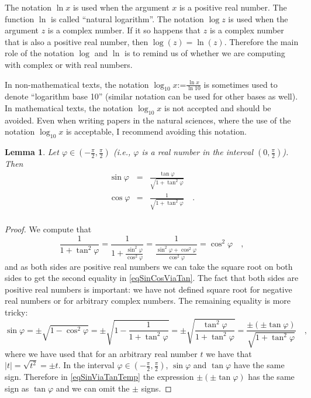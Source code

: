 \documentclass[12pt]{book}
\newcommand{\eqdef}{\textbf{:=}}
\newtheorem{lemma}[theorem]{Lemma}
\begin{document}
The notation $\ln x$  is used when the argument $x$ is a positive real number. The function $\ln$ is called ``natural logarithm''. The notation $\log z$ is used when the argument $z$ is a complex number. If it so happens that $z$ is a complex number that is also a positive real number, then $\log(z)=\ln(z)$. Therefore the main role of the notation $\log$ and $\ln$ is to remind us of whether we are computing with complex or with real numbers.

In non-mathematical texts, the notation $\log_{10} x\eqdef \frac{\ln x}{\ln 10}$ is sometimes used to denote ``logarithm base 10'' (similar notation can be used for other bases as well). In mathematical texts, the notation $\log_{10} x$ is not accepted and should be avoided. Even when writing papers in the natural sciences, where the use of the notation $\log_{10} x$ is acceptable, I  recommend avoiding this notation.

\begin{lemma}
Let $\varphi\in (-\frac{\pi}{2} ,\frac{\pi}{2})$ (i.e., $\varphi$ is a real number in the interval $(0,\frac{\pi}{2})$). Then
\begin{equation}\label{eqSinCosViaTan}
\begin{array}{rcl}
\sin \varphi &=& \frac{ \tan \varphi}{\sqrt  {1+\tan^2 \varphi  }}\\
\cos \varphi &=& \frac{1}{\sqrt  {1+\tan^2 \varphi  }}\quad .\\
\end{array}
\end{equation}
\end{lemma}
\begin{proof}
We compute that
\[\frac{1}{1+\tan^2 \varphi} = \frac{1}{1+\frac{\sin^2 \varphi}{\cos^2\varphi}}= \frac{1}{\frac{\sin^2\varphi+\cos^2\varphi}{\cos^2\varphi}}= \cos^2{\varphi}\quad ,
\]
and as both sides are positive real numbers we can take the square root on both sides to get the second equality in \eqref{eqSinCosViaTan}. The fact that both sides are positive real numbers is important: we have not defined square root for negative real numbers or for arbitrary complex numbers. The remaining equality is more tricky:
\begin{equation}\label{eqSinViaTanTemp}
\sin \varphi = \pm \sqrt{1-\cos^2\varphi}= \pm \sqrt{1-\frac{1}{1+\tan^2\varphi}}= \pm \sqrt{\frac{\tan^2\varphi}{1+\tan^2\varphi}}=
\frac{\pm (\pm \tan\varphi)}{\sqrt{1+\tan^2\varphi}}\quad ,
\end{equation}
where we have used that for an arbitrary real number $t$ we have that $|t|=\sqrt{t^2}=\pm t$. In the interval $\varphi\in (-\frac{\pi}{2} ,\frac{\pi}{2})$, $\sin \varphi$ and $\tan \varphi$ have the same sign. Therefore in \eqref{eqSinViaTanTemp} the expression $\pm(\pm \tan\varphi)$ has the same sign as $\tan \varphi$ and we can omit the $\pm$ signs.
\end{proof}
\end{document}
